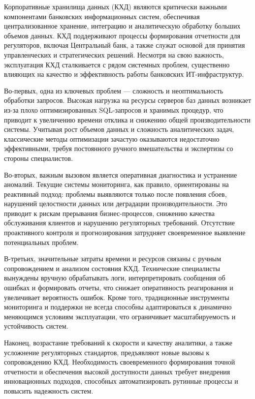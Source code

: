 \teoretic %

Корпоративные хранилища данных (КХД) являются критически важными компонентами банковских информационных систем, обеспечивая централизованное хранение, интеграцию и аналитическую обработку больших объемов данных. КХД поддерживают процессы формирования отчетности для регуляторов, включая Центральный банк, а также служат основой для принятия управленческих и стратегических решений. Несмотря на свою важность, эксплуатация КХД сталкивается с рядом системных проблем, существенно влияющих на качество и эффективность работы банковских ИТ-инфраструктур.

Во-первых, одна из ключевых проблем — сложность и неоптимальность обработки запросов. Высокая нагрузка на ресурсы серверов баз данных возникает из-за плохо оптимизированных SQL-запросов и хранимых процедур, что приводит к увеличению времени отклика и снижению общей производительности системы. Учитывая рост объемов данных и сложность аналитических задач, классические методы оптимизации зачастую оказываются недостаточно эффективными, требуя постоянного ручного вмешательства и экспертизы со стороны специалистов.

Во-вторых, важным вызовом является оперативная диагностика и устранение аномалий. Текущие системы мониторинга, как правило, ориентированы на реактивный подход: проблемы выявляются только после появления сбоев, нарушений целостности данных или деградации производительности. Это приводит к рискам прерывания бизнес-процессов, снижению качества обслуживания клиентов и нарушению регуляторных требований. Отсутствие проактивного контроля и прогнозирования затрудняет своевременное выявление потенциальных проблем.

В-третьих, значительные затраты времени и ресурсов связаны с ручным сопровождением и анализом состояния КХД. Технические специалисты вынуждены вручную обрабатывать логи, интерпретировать сообщения об ошибках и формировать отчеты, что снижает оперативность реагирования и увеличивает вероятность ошибок. Кроме того, традиционные инструменты мониторинга и поддержки не всегда способны адаптироваться к динамично меняющимся условиям эксплуатации, что ограничивает масштабируемость и устойчивость систем.

Наконец, возрастание требований к скорости и качеству аналитики, а также усложнение регуляторных стандартов, предъявляют новые вызовы к сопровождению КХД. Необходимость своевременного формирования точной отчетности и обеспечения высокой доступности данных требует внедрения инновационных подходов, способных автоматизировать рутинные процессы и повысить надежность систем.


